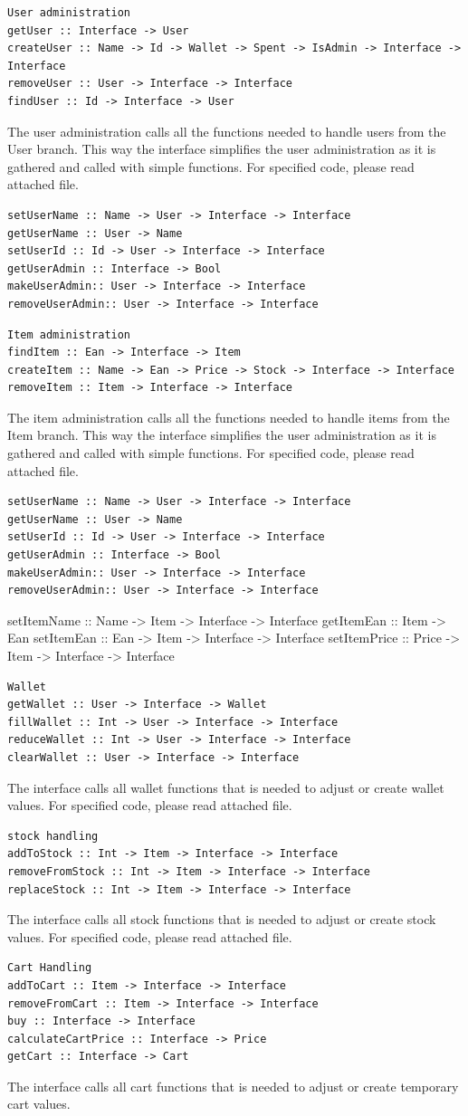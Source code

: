\documentclass[11pt]{article}
\begin{document}
\begin{lstlisting}
User administration
getUser :: Interface -> User
createUser :: Name -> Id -> Wallet -> Spent -> IsAdmin -> Interface -> Interface
removeUser :: User -> Interface -> Interface
findUser :: Id -> Interface -> User
\end{lstlisting}
The user administration calls all the functions needed to handle users from the User branch. This way the interface simplifies the user administration as it is gathered and called with simple functions. For specified code, please read attached file.
\begin{lstlisting}
setUserName :: Name -> User -> Interface -> Interface
getUserName :: User -> Name
setUserId :: Id -> User -> Interface -> Interface
getUserAdmin :: Interface -> Bool
makeUserAdmin:: User -> Interface -> Interface
removeUserAdmin:: User -> Interface -> Interface
\end{lstlisting}
\begin{lstlisting}
Item administration
findItem :: Ean -> Interface -> Item
createItem :: Name -> Ean -> Price -> Stock -> Interface -> Interface
removeItem :: Item -> Interface -> Interface
\end{lstlisting}
The item administration calls all the functions needed to handle items from the Item branch. This way the interface simplifies the user administration as it is gathered and called with simple functions. For specified code, please read attached file.
\begin{lstlisting}
setUserName :: Name -> User -> Interface -> Interface
getUserName :: User -> Name
setUserId :: Id -> User -> Interface -> Interface
getUserAdmin :: Interface -> Bool
makeUserAdmin:: User -> Interface -> Interface
removeUserAdmin:: User -> Interface -> Interface
\end{lstlisting}
setItemName :: Name -> Item -> Interface -> Interface
getItemEan :: Item -> Ean
setItemEan :: Ean -> Item -> Interface -> Interface
setItemPrice :: Price -> Item -> Interface -> Interface
\begin{lstlisting}
Wallet
getWallet :: User -> Interface -> Wallet
fillWallet :: Int -> User -> Interface -> Interface
reduceWallet :: Int -> User -> Interface -> Interface
clearWallet :: User -> Interface -> Interface
\end{lstlisting}
The interface calls all wallet functions that is needed to adjust or create wallet values. For specified code, please read attached file.
\begin{lstlisting}
stock handling
addToStock :: Int -> Item -> Interface -> Interface
removeFromStock :: Int -> Item -> Interface -> Interface
replaceStock :: Int -> Item -> Interface -> Interface
\end{lstlisting}
The interface calls all stock functions that is needed to adjust or create stock values. For specified code, please read attached file.
\begin{lstlisting}
Cart Handling
addToCart :: Item -> Interface -> Interface
removeFromCart :: Item -> Interface -> Interface
buy :: Interface -> Interface
calculateCartPrice :: Interface -> Price
getCart :: Interface -> Cart
\end{lstlisting}
The interface calls all cart functions that is needed to adjust or create temporary cart values.
\newpage
\end{document}
